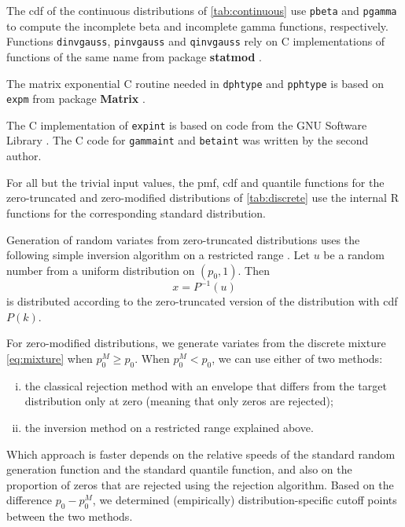\documentclass[x11names]{article}
\newcommand{\proglang}[1]{\textsf{#1}}
\newcommand{\pkg}[1]{\textbf{#1}}
\newcommand{\code}[1]{\texttt{#1}}
\begin{document}
The cdf of the continuous distributions of \autoref{tab:continuous}
use \code{pbeta} and \code{pgamma} to compute the incomplete beta and
incomplete gamma functions, respectively. Functions \code{dinvgauss},
\code{pinvgauss} and \code{qinvgauss} rely on \proglang{C}
implementations of functions of the same name from package
\pkg{statmod} \citep{statmod}.

The matrix exponential \proglang{C} routine needed in \code{dphtype}
and \code{pphtype} is based on \code{expm} from package
\pkg{Matrix} \citep{Matrix}.

The C implementation of \code{expint} is based on code from the GNU
Software Library \citep{GSL}. The \proglang{C} code for
\code{gammaint} and \code{betaint} was written by the second author.

For all but the trivial input values, the pmf, cdf and quantile
functions for the zero-truncated and zero-modified distributions of
\autoref{tab:discrete} use the internal \proglang{R} functions for the
corresponding standard distribution.

Generation of random variates from zero-truncated distributions uses
the following simple inversion algorithm on a restricted range
\citep{Dalgaard:r-help:2005,Thomopoulos:2013:simulation}.
Let $u$ be a random number from a uniform distribution on $(p_0, 1)$.
Then
\begin{equation*}
  x = P^{-1}(u)
\end{equation*}
is distributed according to the zero-truncated version of the
distribution with cdf $P(k)$.

For zero-modified distributions, we generate variates from the
discrete mixture \eqref{eq:mixture} when $p_0^M \geq p_0$. When
$p_0^M < p_0$, we can use either of two methods:
\begin{enumerate}[i)]
\item the classical rejection method with an envelope that differs
  from the target distribution only at zero (meaning that only zeros
  are rejected);
\item the inversion method on a restricted range explained above.
\end{enumerate}
Which approach is faster depends on the relative speeds of the
standard random generation function and the standard quantile
function, and also on the proportion of zeros that are rejected using
the rejection algorithm. Based on the difference $p_0 - p_0^M$, we
determined (empirically) distribution-specific cutoff points between
the two methods.
\end{document}
